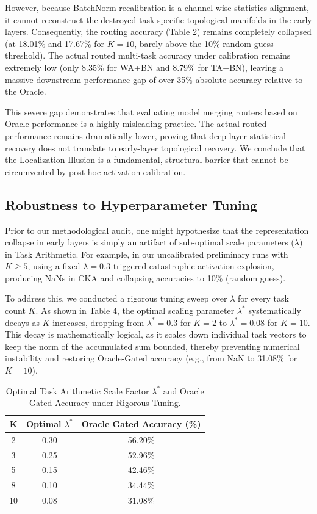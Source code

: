 \documentclass{article}
\theoremstyle{plain}
\theoremstyle{definition}
\theoremstyle{remark}
\begin{document}
However, because BatchNorm recalibration is a channel-wise statistics alignment, it cannot reconstruct the destroyed task-specific topological manifolds in the early layers. Consequently, the routing accuracy (Table 2) remains completely collapsed (at 18.01\% and 17.67\% for $K=10$, barely above the 10\% random guess threshold). The actual routed multi-task accuracy under calibration remains extremely low (only 8.35\% for WA+BN and 8.79\% for TA+BN), leaving a massive downstream performance gap of over 35\% absolute accuracy relative to the Oracle. 

This severe gap demonstrates that evaluating model merging routers based on Oracle performance is a highly misleading practice. The actual routed performance remains dramatically lower, proving that deep-layer statistical recovery does not translate to early-layer topological recovery. We conclude that the Localization Illusion is a fundamental, structural barrier that cannot be circumvented by post-hoc activation calibration.

\subsection{Robustness to Hyperparameter Tuning}
Prior to our methodological audit, one might hypothesize that the representation collapse in early layers is simply an artifact of sub-optimal scale parameters ($\lambda$) in Task Arithmetic. For example, in our uncalibrated preliminary runs with $K \ge 5$, using a fixed $\lambda = 0.3$ triggered catastrophic activation explosion, producing NaNs in CKA and collapsing accuracies to 10\% (random guess).

To address this, we conducted a rigorous tuning sweep over $\lambda$ for every task count $K$. As shown in Table 4, the optimal scaling parameter $\lambda^*$ systematically decays as $K$ increases, dropping from $\lambda^* = 0.3$ for $K=2$ to $\lambda^* = 0.08$ for $K=10$. This decay is mathematically logical, as it scales down individual task vectors to keep the norm of the accumulated sum bounded, thereby preventing numerical instability and restoring Oracle-Gated accuracy (e.g., from NaN to 31.08\% for $K=10$).

\begin{table}[ht]
\centering
\caption{Optimal Task Arithmetic Scale Factor $\lambda^*$ and Oracle Gated Accuracy under Rigorous Tuning.}
\vskip 0.1in
\begin{tabular}{ccc}
\toprule
\textbf{K} & \textbf{Optimal $\lambda^*$} & \textbf{Oracle Gated Accuracy (\%)} \\
\midrule
2 & 0.30 & 56.20\% \\
3 & 0.25 & 52.96\% \\
5 & 0.15 & 42.46\% \\
8 & 0.10 & 34.44\% \\
10 & 0.08 & 31.08\% \\
\bottomrule
\end{tabular}
\end{table}
\end{document}
